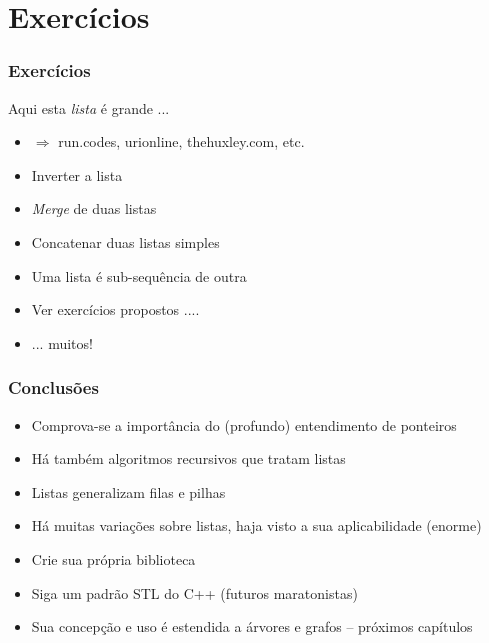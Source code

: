 \section{Exercícios}

\begin{frame}%

\frametitle{Exercícios}

\begin{block}{Aqui esta \textit{lista} é grande ... }

\begin{itemize}

	\item $\Rightarrow $ run.codes, urionline, thehuxley.com, etc.
	
  \item Inverter a lista
  \item \textit{Merge} de duas listas
  \item Concatenar duas listas simples
  \item Uma lista é sub-sequência de outra
  \item Ver exercícios propostos ....
  \item ... muitos!
  
  
  
\end{itemize}


\end{block}


\end{frame} 

\begin{frame}%

\frametitle{Conclusões}

\begin{block}{}

\begin{itemize}
  \item Comprova-se a importância do (profundo) entendimento de ponteiros
  \item Há também algoritmos recursivos que tratam listas 
  \item Listas generalizam filas e pilhas
  \item Há muitas variações sobre listas, haja visto a sua aplicabilidade (enorme)

  \item Crie sua própria biblioteca
  \item Siga um padrão STL do C++ (futuros maratonistas)
  \item Sua concepção e uso é estendida a árvores e grafos -- próximos capítulos
   
  
\end{itemize}
\end{block}
\end{frame} 





